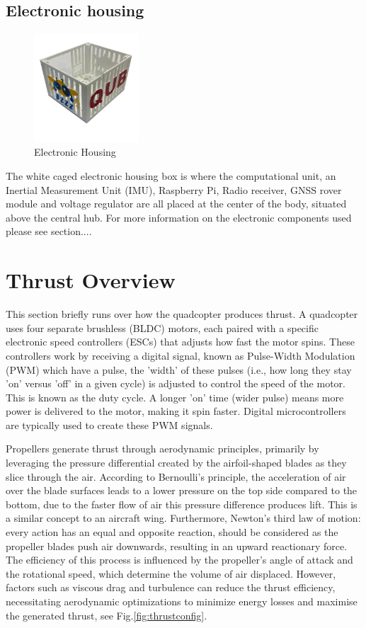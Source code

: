 \documentclass{report}
\begin{document}
\subsection*{Electronic housing}
\begin{figure}[H]
  \centering
  \includegraphics[width=0.35\textwidth]{Pictures/electronic_housing.png} 
  \caption{Electronic Housing}
  \label{fig:electronic_housing}
\end{figure}
The white caged electronic housing box is where the computational unit, an
Inertial Measurement Unit (IMU), Raspberry Pi, Radio receiver, GNSS rover module
and voltage regulator are all placed at the center of the body, situated above
the central hub. For more information on the electronic components used please
see section....
 
\section{Thrust Overview}
This section briefly runs over how the quadcopter produces thrust. A quadcopter
uses four separate brushless (BLDC) motors, each paired with a specific
electronic speed controllers (ESCs) that adjusts how fast the motor spins. These
controllers work by receiving a digital signal, known as Pulse-Width Modulation
(PWM) which have a pulse, the 'width' of these pulses (i.e., how long they stay
'on' versus 'off' in a given cycle) is adjusted to control the speed of the
motor. This is known as the duty cycle. A longer 'on' time (wider pulse) means
more power is delivered to the motor, making it spin faster. Digital
microcontrollers are typically used to create these PWM signals.

Propellers generate thrust through aerodynamic principles, primarily by
leveraging the pressure differential created by the airfoil-shaped blades as
they slice through the air. According to Bernoulli's principle, the acceleration
of air over the blade surfaces leads to a lower pressure on the top side
compared to the bottom, due to the faster flow of air this pressure difference
produces lift. This is a similar concept to an aircraft wing. Furthermore,
Newton's third law of motion: every action has an equal and opposite reaction,
should be considered as the propeller blades push air downwards, resulting in an
upward reactionary force. The efficiency of this process is influenced by the
propeller's angle of attack and the rotational speed, which determine the volume
of air displaced. However, factors such as viscous drag and turbulence can
reduce the thrust efficiency, necessitating aerodynamic optimizations to
minimize energy losses and maximise the generated thrust, see
Fig.\ref{fig:thrustconfig}.
\end{document}
